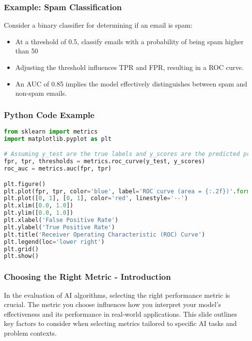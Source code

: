 \documentclass[aspectratio=169]{beamer}
\begin{document}
\begin{frame}
    \frametitle{Example: Spam Classification}
    Consider a binary classifier for determining if an email is spam:
    \begin{itemize}
        \item At a threshold of 0.5, classify emails with a probability of being spam higher than 50%
        \item Adjusting the threshold influences TPR and FPR, resulting in a ROC curve.
        \item An AUC of 0.85 implies the model effectively distinguishes between spam and non-spam emails.
    \end{itemize}
\end{frame}

\begin{frame}[fragile]
    \frametitle{Python Code Example}
    \begin{lstlisting}[language=Python]
from sklearn import metrics
import matplotlib.pyplot as plt

# Assuming y_test are the true labels and y_scores are the predicted probabilities
fpr, tpr, thresholds = metrics.roc_curve(y_test, y_scores)
roc_auc = metrics.auc(fpr, tpr)

plt.figure()
plt.plot(fpr, tpr, color='blue', label='ROC curve (area = {:.2f})'.format(roc_auc))
plt.plot([0, 1], [0, 1], color='red', linestyle='--')
plt.xlim([0.0, 1.0])
plt.ylim([0.0, 1.0])
plt.xlabel('False Positive Rate')
plt.ylabel('True Positive Rate')
plt.title('Receiver Operating Characteristic (ROC) Curve')
plt.legend(loc='lower right')
plt.grid()
plt.show()
    \end{lstlisting}
\end{frame}

\begin{frame}[fragile]
    \frametitle{Choosing the Right Metric - Introduction}
    In the evaluation of AI algorithms, selecting the right performance metric is crucial.  
    The metric you choose influences how you interpret your model's effectiveness and its performance in real-world applications.  
    This slide outlines key factors to consider when selecting metrics tailored to specific AI tasks and problem contexts.
\end{frame}
\end{document}
